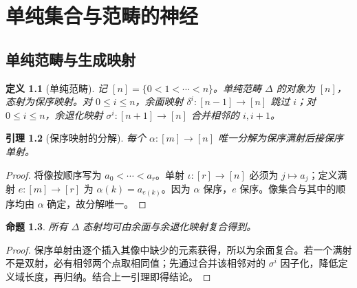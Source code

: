 \documentclass[12pt,oneside,openany,fontset=none]{ctexbook}
\theoremstyle{cn}
\newtheorem{definition}{定义}[chapter]
\newtheorem{lemma}[definition]{引理}
\newtheorem{proposition}[definition]{命题}
\numberwithin{equation}{chapter}
\begin{document}
\chapter{单纯集合与范畴的神经}
\section{单纯范畴与生成映射}
\begin{definition}[单纯范畴]
记 $[n]=\{0<1<\cdots<n\}$。单纯范畴 $\Delta$ 的对象为 $[n]$，态射为保序映射。对 $0\le i\le n$，余面映射 $\delta^i:[n-1]\to[n]$ 跳过 $i$；对 $0\le i\le n$，余退化映射 $\sigma^i:[n+1]\to[n]$ 合并相邻的 $i,i+1$。
\end{definition}
\begin{lemma}[保序映射的分解]
每个 $\alpha:[m]\to[n]$ 唯一分解为保序满射后接保序单射。
\end{lemma}
\begin{proof}
将像按顺序写为 $a_0<\cdots<a_r$。单射 $\iota:[r]\to[n]$ 必须为 $j\mapsto a_j$；定义满射 $e:[m]\to[r]$ 为 $\alpha(k)=a_{e(k)}$。因为 $\alpha$ 保序，$e$ 保序。像集合与其中的顺序均由 $\alpha$ 确定，故分解唯一。
\end{proof}
\begin{proposition}
所有 $\Delta$ 态射均可由余面与余退化映射复合得到。
\end{proposition}
\begin{proof}
保序单射由逐个插入其像中缺少的元素获得，所以为余面复合。若一个满射不是双射，必有相邻两个点取相同值；先通过合并该相邻对的 $\sigma^i$ 因子化，降低定义域长度，再归纳。结合上一引理即得结论。
\end{proof}
\end{document}
